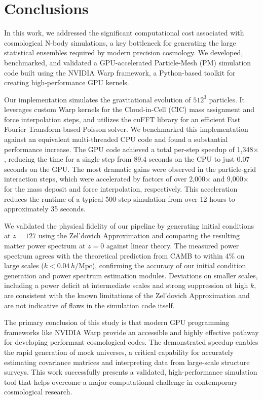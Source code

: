 \documentclass[]{article}
\begin{document}
\section{Conclusions}
\label{sec:conclusions}


In this work, we addressed the significant computational cost associated with cosmological N-body simulations, a key bottleneck for generating the large statistical ensembles required by modern precision cosmology. We developed, benchmarked, and validated a GPU-accelerated Particle-Mesh (PM) simulation code built using the NVIDIA Warp framework, a Python-based toolkit for creating high-performance GPU kernels.

Our implementation simulates the gravitational evolution of $512^3$ particles. It leverages custom Warp kernels for the Cloud-in-Cell (CIC) mass assignment and force interpolation steps, and utilizes the cuFFT library for an efficient Fast Fourier Transform-based Poisson solver. We benchmarked this implementation against an equivalent multi-threaded CPU code and found a substantial performance increase. The GPU code achieved a total per-step speedup of 1,348$\times$, reducing the time for a single step from 89.4 seconds on the CPU to just 0.07 seconds on the GPU. The most dramatic gains were observed in the particle-grid interaction steps, which were accelerated by factors of over 2,000$\times$ and 9,000$\times$ for the mass deposit and force interpolation, respectively. This acceleration reduces the runtime of a typical 500-step simulation from over 12 hours to approximately 35 seconds.

We validated the physical fidelity of our pipeline by generating initial conditions at $z=127$ using the Zel'dovich Approximation and comparing the resulting matter power spectrum at $z=0$ against linear theory. The measured power spectrum agrees with the theoretical prediction from CAMB to within 4\% on large scales ($k < 0.04 \, h/\text{Mpc}$), confirming the accuracy of our initial condition generation and power spectrum estimation modules. Deviations on smaller scales, including a power deficit at intermediate scales and strong suppression at high $k$, are consistent with the known limitations of the Zel'dovich Approximation and are not indicative of flaws in the simulation code itself.

The primary conclusion of this study is that modern GPU programming frameworks like NVIDIA Warp provide an accessible and highly effective pathway for developing performant cosmological codes. The demonstrated speedup enables the rapid generation of mock universes, a critical capability for accurately estimating covariance matrices and interpreting data from large-scale structure surveys. This work successfully presents a validated, high-performance simulation tool that helps overcome a major computational challenge in contemporary cosmological research.


{}

\end{document}

